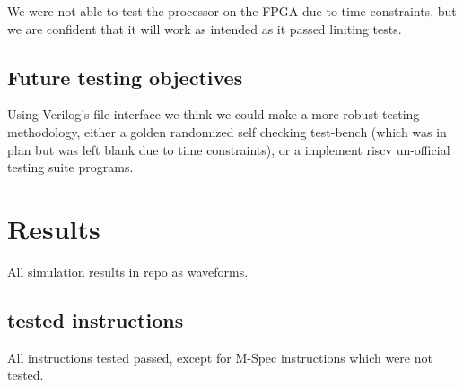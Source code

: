 \documentclass{article}
\begin{document}
We were not able to test the processor on the FPGA due to time constraints, but we are confident that it will work as intended as it passed liniting tests.

\subsection*{Future testing objectives}

\quad Using Verilog's file interface we think we could make a more robust testing methodology, either a golden randomized self checking test-bench (which was in plan but was left blank due to time constraints), or a implement riscv un-official testing suite programs.

\section{Results}  
All simulation results in repo as waveforms.

\subsection*{tested instructions} 
All instructions tested passed, except for M-Spec instructions which were not tested.
\end{document}
